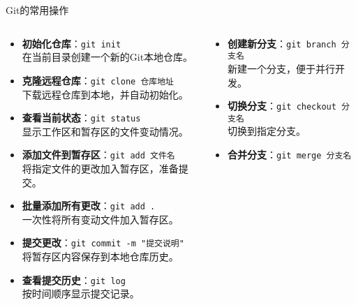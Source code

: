 \documentclass[UTF8,aspectratio=169]{beamer}
\begin{document}
\begin{frame}{Git的常用操作}
    \small
    \begin{columns}
        \begin{column}{0.48\textwidth}
            \begin{itemize}
                \item \textbf{初始化仓库}：\texttt{git init} \\
                    在当前目录创建一个新的Git本地仓库。
                \item \textbf{克隆远程仓库}：\texttt{git clone 仓库地址} \\
                    下载远程仓库到本地，并自动初始化。
                \item \textbf{查看当前状态}：\texttt{git status} \\
                    显示工作区和暂存区的文件变动情况。
                \item \textbf{添加文件到暂存区}：\texttt{git add 文件名} \\
                    将指定文件的更改加入暂存区，准备提交。
                \item \textbf{批量添加所有更改}：\texttt{git add .} \\
                    一次性将所有变动文件加入暂存区。
                \item \textbf{提交更改}：\texttt{git commit -m "提交说明"} \\
                    将暂存区内容保存到本地仓库历史。
                \item \textbf{查看提交历史}：\texttt{git log} \\
                    按时间顺序显示提交记录。
            \end{itemize}
        \end{column}
        \hspace{0.02\textwidth}
        \begin{column}{0.48\textwidth}
            \begin{itemize}
                \item \textbf{创建新分支}：\texttt{git branch 分支名} \\
                    新建一个分支，便于并行开发。
                \item \textbf{切换分支}：\texttt{git checkout 分支名} \\
                    切换到指定分支。
                \item \textbf{合并分支}：\texttt{git merge 分支名} \\

\end{itemize}
\end{column}
\end{columns}
\end{frame}
\end{document}
